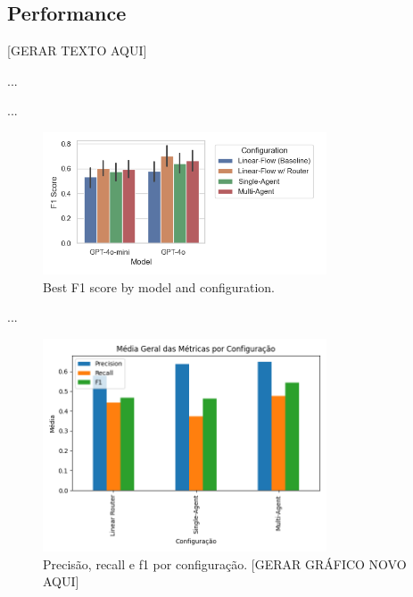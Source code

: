         
        \subsection{Performance}

        
            [GERAR TEXTO AQUI]

            ... \cite{Antoniak2016}

            ...
            
            \begin{figure}[h]
                \centering              
                \includegraphics[width=0.75\textwidth]{images_exp2/bar_best_f1_by_model_and_configuration.png}
                \caption{Best F1 score by model and configuration.}
                \label{fig:best_f1_by_model_and_configuration}
            \end{figure}


            ...

            
            \begin{figure}[h!]
                \centering              
                \includegraphics[width=0.75\textwidth]{images_part_2/media_geral_por_configuracao.png}
                \caption{Precisão, recall e f1 por configuração.             [GERAR GRÁFICO NOVO AQUI]}
                \label{fig:media_geral_por_configuracao}
            \end{figure}


